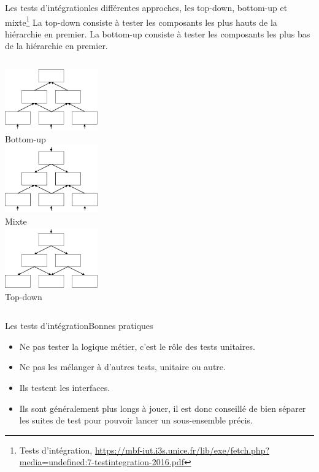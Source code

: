 \documentclass{beamer}
\begin{document}
    \begin{frame}{Les tests d'intégration}{les différentes approches, les top-down, bottom-up et mixte\footnote{\label{unice-ti} Tests d’intégration, \url{https://mbf-iut.i3s.unice.fr/lib/exe/fetch.php?media=undefined:7-testintegration-2016.pdf}}}
        La top-down consiste à tester les composants les plus hauts de la hiérarchie en premier.
        \break
        La bottom-up consiste à tester les composants les plus bas de la hiérarchie en premier.
        \begin{columns}
            \centering
            \includegraphics[width=4cm]{image/ti-bottom-up.drawio} \\ Bottom-up \\
            \centering
            \includegraphics[width=4cm]{image/ti-mixte.drawio} \\ Mixte \\
            \centering
            \includegraphics[width=4cm]{image/ti-top-down.drawio} \\ Top-down \\
        \end{columns}
    \end{frame}

    \begin{frame}{Les tests d'intégration}{Bonnes pratiques}
        \begin{itemize}
            \item Ne pas tester la logique métier, c'est le rôle des tests unitaires.
            \item Ne pas les mélanger à d'autres tests, unitaire ou autre.
            \item Ils testent les interfaces.
            \item Ils sont généralement plus longs à jouer, il est donc conseillé de bien séparer les suites de test pour pouvoir lancer un sous-ensemble précis.
        \end{itemize}
    \end{frame}
\end{document}
